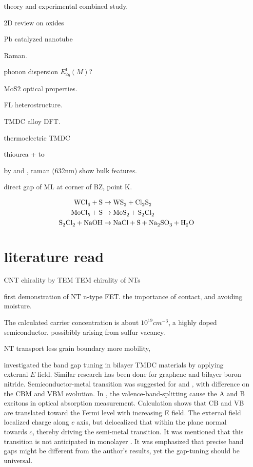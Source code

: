  theory and experimental combined study. \cite{Klein2001}

2D review on oxides \cite{Osada2012}

Pb catalyzed  nanotube \cite{Brontvein2012}

 Raman.\cite{Zhao2013} \cite{Sekine1980}

phonon dispersion $E_{2g}^1(M)$? \cite{Ataca2012}

MoS2 optical properties.\cite{Search1979}

FL heterostructure. \cite{Yu2013a}

\cite{Kang2013} TMDC alloy DFT.

thermoelectric TMDC \cite{Wickramaratne2014}

 thiourea +  to  \cite{Leonard-Deepak2011}

 by  and , raman (632nm) show bulk features\cite{Tenne2008}.

direct gap of ML at corner of BZ, point K.

\begin{align}
\cee{WCl6 + S &\rightarrow WS2 + Cl2S2}\\
\cee{MoCl5 + S &\rightarrow MoS2 + S2Cl2} \\
\cee{S2Cl2 + NaOH &\rightarrow NaCl + S + Na2SO3 + H2O}
\end{align}

\section{literature read}

CNT chirality by TEM \cite{Zhang1993} TEM chirality of  NTs


first demonstration of  NT n-type FET. \cite{Levi2013}
the importance of contact, and avoiding moisture. 

The calculated carrier concentration is about $10^{19}cm^{-3}$, a highly doped semiconductor, possibibly arising from sulfur vacancy. 

 NT transport \cite{Zhang2012c}
less grain boundary more mobility, 

\citeauthor{Ramasubramaniam2011} investigated the band gap tuning in bilayer TMDC materials by applying external $E$ field. Similar research has been done for graphene and bilayer boron nitride. Semiconductor-metal transition was suggested for  and , with difference on the CBM and VBM evolution. In , the valence-band-splitting cause the A and B excitons in optical absorption measurement. Calculation shows that CB and VB are translated toward the Fermi level with increasing E field.  The external field localized charge along $c$ axis, but delocalized that within the plane normal towards $c$, thereby driving the semi-metal transition. It was mentioned that this transition is not anticipated in monolayer . It was emphasized that precise band gaps might be different from the author’s results, yet the gap-tuning should be universal.\cite{Ramasubramaniam2011}

